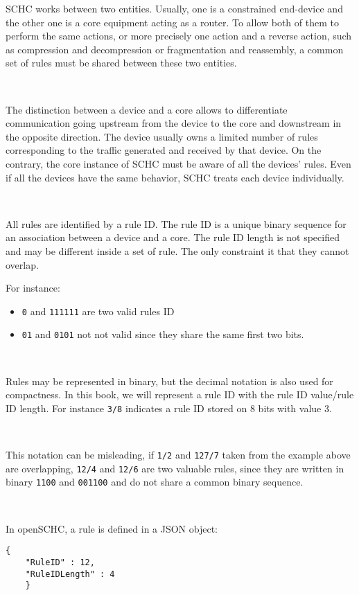 SCHC  works between two entities. Usually, one is a constrained end-device and the other one is a core equipment acting as a router. To allow both of them to perform the same actions, or more precisely one action and a reverse action, such as compression and decompression or fragmentation and reassembly, a common set of rules must be shared between these two entities.

~

The distinction between a device and a core allows to differentiate communication going upstream from the device to the core and downstream in the opposite direction. The device usually owns a limited number of rules corresponding to the traffic  generated and received by that device. On the contrary, the core instance of SCHC must be aware of all the devices' rules. Even if all the devices have the same behavior, SCHC treats each device individually. 

~~

All rules are identified by a rule ID. The rule ID is a unique binary sequence for an association between a device and a core. The rule ID length is not specified and may be different inside a set of rule. The only constraint it that they cannot overlap.

For instance:


\begin{itemize}
\item\texttt{0} and \texttt{111111} are two valid rules ID
\item \texttt{01} and \texttt{0101} not not valid since they share the same first two bits.
\end{itemize}

~


Rules may be represented in binary, but the decimal notation is also used for compactness. In this book, we will represent a rule ID with the rule ID value/rule ID length. For instance \texttt{3/8} indicates a rule ID stored on 8 bits with value 3.

~

This notation can be misleading, if \texttt{1/2} and \texttt{127/7} taken from the example above are overlapping, \texttt{12/4} and \texttt{12/6} are two valuable rules, since they are written in binary \texttt{1100} and \texttt{001100} and do not share a common binary sequence.

~~~

In openSCHC, a rule is defined in a JSON object:

\begin{lstlisting}[backgroundcolor=\color{yellow}]
    {
    "RuleID" : 12,
    "RuleIDLength" : 4
    }
\end{lstlisting}

